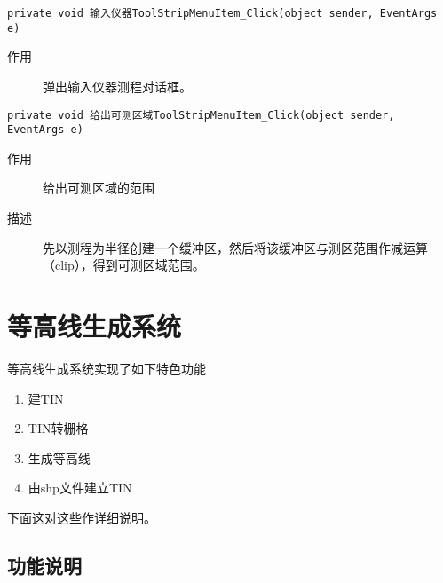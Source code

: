 \documentclass[twoside,color=blue,mathpazo,titlestyle=hang,12pt]{elegantbook}
\numberwithin{equation}{section}
\begin{document}
\begin{lstlisting}
private void 输入仪器ToolStripMenuItem_Click(object sender, EventArgs e)
\end{lstlisting}
\begin{description}
\item[作用] 弹出输入仪器测程对话框。
\end{description}
\begin{lstlisting}
private void 给出可测区域ToolStripMenuItem_Click(object sender, EventArgs e)
\end{lstlisting}
\begin{description}
\item[作用] 给出可测区域的范围
\item[描述] 先以测程为半径创建一个缓冲区，然后将该缓冲区与测区范围作减运算（clip），得到可测区域范围。
\end{description}



\chapter{等高线生成系统}

等高线生成系统实现了如下特色功能
\begin{enumerate}
\item 建TIN
\item TIN转栅格
\item 生成等高线
\item 由shp文件建立TIN
\end{enumerate}

下面这对这些作详细说明。

\section{功能说明}
\end{document}
